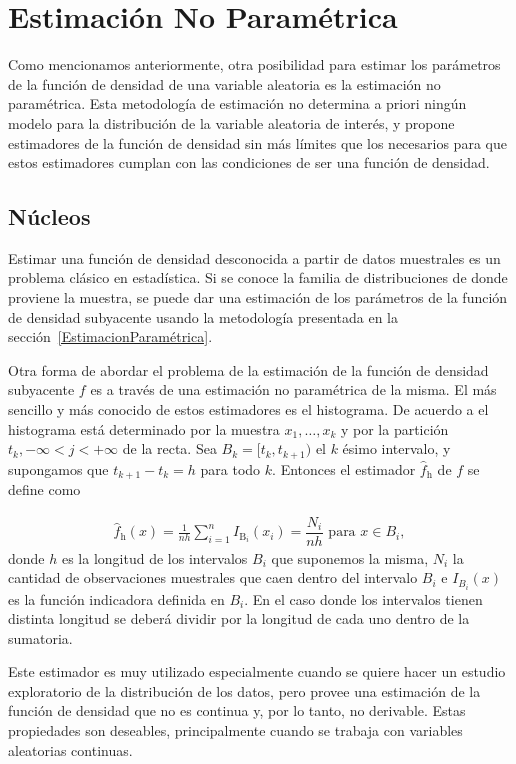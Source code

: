 \section{Estimación No Paramétrica}

Como mencionamos anteriormente, otra posibilidad para estimar los parámetros de la función de densidad de una variable aleatoria es la estimación no paramétrica. Esta metodología de estimación  no determina a priori ningún modelo para la distribución de la variable aleatoria de interés, y propone estimadores de la función de densidad sin más límites que los necesarios para que estos estimadores cumplan con las condiciones de ser una función de densidad.


\subsection{Núcleos}
Estimar una función de densidad desconocida a partir de datos muestrales es un problema clásico en estadística. Si se conoce la familia de distribuciones de donde proviene la muestra, se puede dar una estimación de los parámetros de la función de densidad subyacente usando la metodología presentada en la sección~\ref{EstimacionParamétrica}. 

Otra forma de abordar el problema de la estimación de la función de densidad subyacente $f$ es a través de una estimación no paramétrica de la misma. El más sencillo y más conocido de estos estimadores es el histograma. De acuerdo a \citet{Scott1992} el histograma está determinado por la muestra ${x_1, \ldots, x_k}$ y por la partición ${t_k, -\infty<j<+\infty}$ de la recta. Sea $B_k=[t_k,t_{k+1})$  el $k$ ésimo intervalo, y supongamos que $t_{k+1}-t_k=h$ para todo $k$. Entonces el estimador $\widehat{f}_\text{h}$ de $f$ se define como 

\begin{align}
\widehat{f}_{\text{h}}(x)=\frac{1}{n h} \sum_{i=1}^n I_{\text{B}_i} (x_i)=\dfrac{N_i}{n h} \text{ para } x \in B_i,
\end{align}
donde $h$ es la longitud de los intervalos $B_i$ que suponemos la misma, $N_i$ la cantidad de observaciones muestrales que caen dentro del intervalo $B_i$ e $I_{B_i}(x)$ es la función indicadora definida en $B_i$. En el caso donde los intervalos tienen distinta longitud se deberá dividir por la longitud de cada uno dentro de la sumatoria.

Este estimador es muy utilizado especialmente cuando se quiere hacer un estudio exploratorio de la distribución de los datos, pero provee una estimación de la función de densidad que no es continua y, por lo tanto, no derivable. Estas propiedades son deseables, principalmente cuando se trabaja con variables aleatorias continuas.

